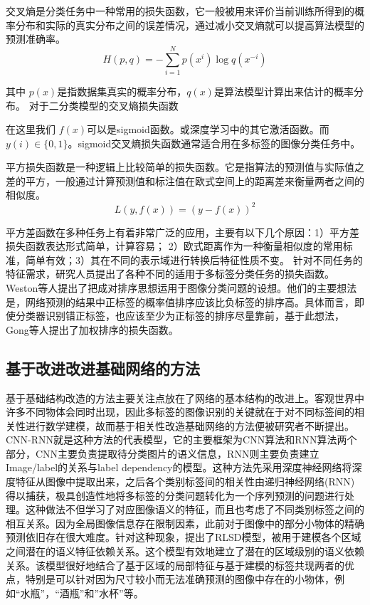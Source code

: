 交叉熵是分类任务中一种常用的损失函数，它一般被用来评价当前训练所得到的概率分布和实际的真实分布之间的误差情况，通过减小交叉熵就可以提高算法模型的预测准确率。
\begin{equation}
\label{dscNoStgProof0}
H(p,q) = -\sum_{i=1}^N p(x^i)\log q(x^{-i})
\end{equation}

其中 $p(x)$是指数据集真实的概率分布，$q(x)$是算法模型计算出来估计的概率分布。
对于二分类模型的交叉熵损失函数

在这里我们 $f(x)$可以是sigmoid函数。或深度学习中的其它激活函数。而 $y(i)\in \{0,1\}$。sigmoid交叉熵损失函数通常适合用在多标签的图像分类任务中。

平方损失函数是一种逻辑上比较简单的损失函数。它是指算法的预测值与实际值之差的平方，一般通过计算预测值和标注值在欧式空间上的距离差来衡量两者之间的相似度。
\begin{equation}
\label{dscNoStgProof0}
L(y,f(x)) = (y-f(x))^2
\end{equation}

平方差函数在多种任务上有着非常广泛的应用，主要有以下几个原因：1）平方差损失函数表达形式简单，计算容易； 2）欧式距离作为一种衡量相似度的常用标准，简单有效；3）其在不同的表示域进行转换后特征性质不变。
针对不同任务的特征需求，研究人员提出了各种不同的适用于多标签分类任务的损失函数。Weston等人提出了把成对排序思想运用于图像分类问题的设想。他们的主要想法是，网络预测的结果中正标签的概率值排序应该比负标签的排序高。具体而言，即使分类器识别错正标签，也应该至少为正标签的排序尽量靠前，基于此想法，Gong等人提出了加权排序的损失函数。

\subsection{基于改进改进基础网络的方法}

基于基础结构改造的方法主要关注点放在了网络的基本结构的改进上。客观世界中许多不同物体会同时出现，因此多标签的图像识别的关键就在于对不同标签间的相关性进行数学建模，故而基于相关性改造基础网络的方法便被研究者不断提出。CNN-RNN就是这种方法的代表模型，它的主要框架为CNN算法和RNN算法两个部分，CNN主要负责提取待分类图片的语义信息，RNN则主要负责建立Image/label的关系与label dependency的模型。这种方法先采用深度神经网络将深度特征从图像中提取出来，之后各个类别标签间的相关性由递归神经网络(RNN)得以捕获，极具创造性地将多标签的分类问题转化为一个序列预测的问题进行处理。这种做法不但学习了对应图像语义的特征，而且也考虑了不同类别标签之间的相互关系。因为全局图像信息存在限制因素，此前对于图像中的部分小物体的精确预测依旧存在很大难度。针对这种现象，提出了RLSD模型，被用于建模各个区域之间潜在的语义特征依赖关系。这个模型有效地建立了潜在的区域级别的语义依赖关系。该模型很好地结合了基于区域的局部特征与基于建模的标签共现两者的优点，特别是可以针对因为尺寸较小而无法准确预测的图像中存在的小物体，例如“水瓶”，“酒瓶”和”水杯”等。

